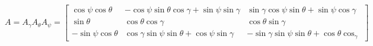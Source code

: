 \documentclass[a4paper, 12pt]{article}%
\begin{document}
	$ A=A_\gamma A_\theta A_\psi=\left[\begin{array}{ccc}\cos \psi \cos \theta & -\cos \psi \sin \theta \cos \gamma+ \sin \psi \sin \gamma & \sin \gamma \cos \psi \sin \theta+ \sin \psi \cos \gamma \\ \sin \theta & \cos \theta \cos \gamma & \cos \theta \sin \gamma \\ -\sin \psi \cos \theta & \cos \gamma \sin \psi \sin \theta+ \cos \psi \sin \gamma & -\sin \gamma \sin \psi \sin \theta+ \cos \theta \cos_\gamma\end{array}\right]$
	
	
	
	
	
	
	
	
	
	
	
	
	
\end{document}
